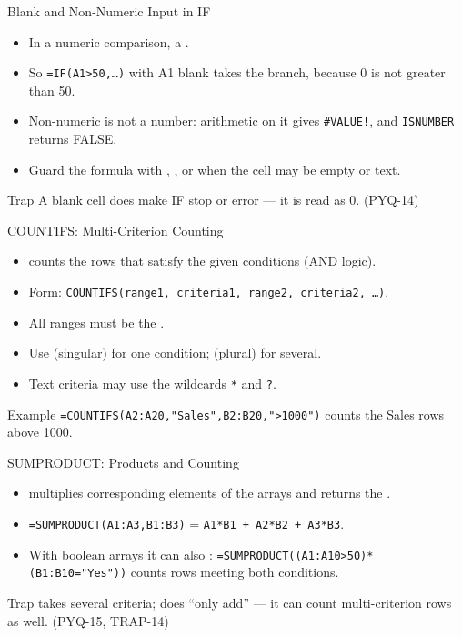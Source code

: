 \documentclass[aspectratio=169]{beamer}
\begin{document}
\begin{frame}{Blank and Non-Numeric Input in IF}
  \begin{itemize}
    \item In a numeric comparison, a .
    \item So \texttt{=IF(A1>50,\ldots)} with A1 blank takes the 
      branch, because 0 is not greater than 50.
    \item Non-numeric  is not a number: arithmetic on it gives
      \texttt{\#VALUE!}, and \texttt{ISNUMBER} returns FALSE.
    \item Guard the formula with , , or
       when the cell may be empty or text.
  \end{itemize}
  \begin{alertblock}{Trap}
    A blank cell does  make IF stop or error --- it is read as 0.
    (PYQ-14)
  \end{alertblock}
\end{frame}

\begin{frame}{COUNTIFS: Multi-Criterion Counting}
  \begin{itemize}
    \item {} counts the rows that satisfy  the given
      conditions (AND logic).
    \item Form: \texttt{COUNTIFS(range1, criteria1, range2, criteria2,
      \ldots)}.
    \item All ranges must be the .
    \item Use  (singular) for one condition; 
      (plural) for several.
    \item Text criteria may use the wildcards \texttt{*} and \texttt{?}.
  \end{itemize}
  \begin{block}{Example}
    \texttt{=COUNTIFS(A2:A20,"Sales",B2:B20,">1000")} counts the Sales rows
    above 1000.
  \end{block}
\end{frame}

\begin{frame}{SUMPRODUCT: Products and Counting}
  \begin{itemize}
    \item {} multiplies corresponding elements of the arrays and
      returns the .
    \item \texttt{=SUMPRODUCT(A1:A3,B1:B3)} =
      \texttt{A1*B1 + A2*B2 + A3*B3}.
    \item With boolean arrays it can also :
      \texttt{=SUMPRODUCT((A1:A10>50)*(B1:B10="Yes"))} counts rows meeting
      both conditions.
  \end{itemize}
  \begin{alertblock}{Trap}
     takes several criteria;  does 
    ``only add'' --- it can count multi-criterion rows as well. (PYQ-15,
    TRAP-14)
  \end{alertblock}
\end{frame}
\end{document}
